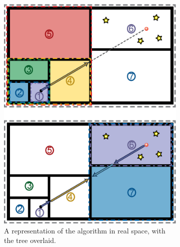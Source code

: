 
\begin{figure}
        \centering
        \begin{subfigure}[b]{0.45\textwidth}
                \includegraphics[width=\textwidth]{graphics/RT_algorithm.eps}
                \caption{A representation of the algorithm in real space, with the tree overlaid.}
                \label{fig:treeclimb}
        \end{subfigure}
        ~ 
        \begin{subfigure}[b]{0.45\textwidth}

\end{subfigure}
\end{figure}
